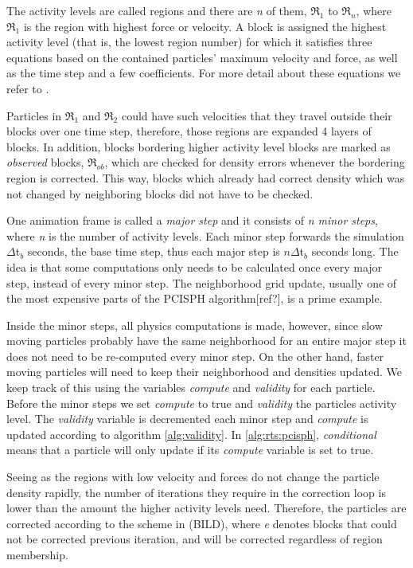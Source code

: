 \documentclass[../../main.tex]{subfiles}
\begin{document}
The activity levels are called regions and there are \textit{n} of them, $\Re_1$ to $\Re_n$, where $\Re_1$ is the region with highest force or velocity. A block is assigned the highest activity level (that is, the lowest region number) for which it satisfies three equations based on the contained particles' maximum velocity and force, as well as the time step and a few coefficients. For more detail about these equations we refer to \citet{goswami2014regional}.

Particles in $\Re_1$ and $\Re_2$ could have such velocities that they travel outside their blocks over one time step, therefore, those regions are expanded 4 layers of blocks. In addition, blocks bordering higher activity level blocks are marked as \textit{observed} blocks, $\Re_{ob}$, which are checked for density errors whenever the bordering region is corrected. This way, blocks which already had correct density which was not changed by neighboring blocks did not have to be checked. 

One animation frame is called a \textit{major step} and it consists of \textit{n minor steps}, where \textit{n} is the number of activity levels. Each minor step forwards the simulation $\Delta$t$_b$ seconds, the base time step, thus each major step is $n\Delta$t$_b$ seconds long. The idea is that some computations only needs to be calculated once every major step, instead of every minor step. The neighborhood grid update, usually one of the most expensive parts of the PCISPH algorithm[ref?], is a prime example. 

Inside the minor steps, all physics computations is made, however, since slow moving particles probably have the same neighborhood for an entire major step it does not need to be re-computed every minor step. On the other hand, faster moving particles will need to keep their neighborhood and densities updated. We keep track of this using the variables \textit{compute} and \textit{validity} for each particle. Before the minor steps we set \textit{compute} to true and \textit{validity} the particles activity level. The \textit{validity} variable is decremented each minor step and \textit{compute} is updated according to algorithm \ref{alg:validity}. In \ref{alg:rts:pcisph}, \textit{conditional} means that a particle will only update if its \textit{compute} variable is set to true. 

Seeing as the regions with low velocity and forces do not change the particle density rapidly, the number of iterations they require in the correction loop is lower than the amount the higher activity levels need. Therefore, the particles are corrected according to the scheme in (BILD), where \textit{e} denotes blocks that could not be corrected previous iteration, and will be corrected regardless of region membership. 
\end{document}
